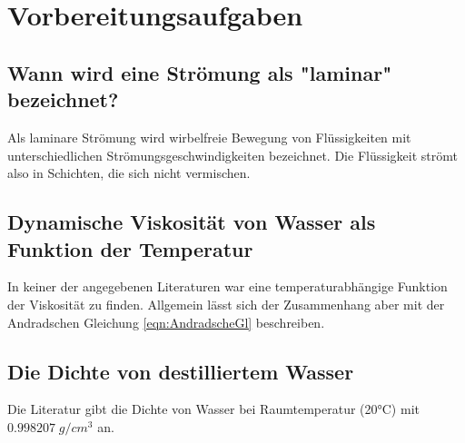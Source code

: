 \section{Vorbereitungsaufgaben}
\label{sec:Vorbereitungsaufgaben}

\subsection{Wann wird eine Strömung als "laminar" bezeichnet?}
    Als laminare Strömung  wird wirbelfreie Bewegung von Flüssigkeiten mit unterschiedlichen Strömungsgeschwindigkeiten bezeichnet. Die Flüssigkeit strömt also in Schichten, die sich nicht vermischen.
    
\subsection{Dynamische Viskosität von Wasser als Funktion der Temperatur}
    In keiner der angegebenen Literaturen war eine temperaturabhängige Funktion der Viskosität zu finden. Allgemein lässt sich der Zusammenhang aber mit der Andradschen 
    Gleichung \eqref{eqn:AndradscheGl} beschreiben.

\subsection{Die Dichte von destilliertem Wasser}
    Die Literatur gibt die Dichte von Wasser bei Raumtemperatur (20°C) mit $0.998207 \;\unit{g/cm^3}$ an.